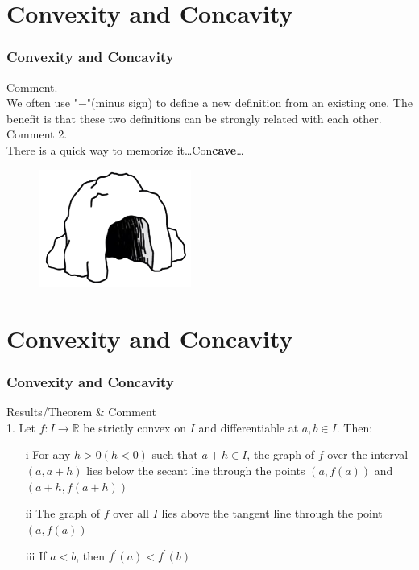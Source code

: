 \documentclass[12pt, t]{beamer}
\begin{document}
\section{Convexity and Concavity}
\begin{frame}
    \frametitle{Convexity and Concavity}
    Comment. \\
    \vspace{0.5em}
    \hspace{1em}
    We often use "$-$"(minus sign) to define a new definition from an existing one. The benefit is that these two definitions can
    be strongly related with each other.\\
    \vspace{1em}
    Comment 2.\\
    \hspace{1em}
    There is a quick way to memorize it\dots\hspace{2em}Con\textbf{cave}\dots
    \begin{figure}[H]
        \centering
        \includegraphics[width=5cm]{Figures/Concave.png}
    \end{figure}

\end{frame}

\section{Convexity and Concavity}
\begin{frame}
    \frametitle{Convexity and Concavity}
    Results/Theorem \& Comment\\
    \vspace{1em}
    1. Let $f:I\rightarrow\mathbb{R}$ be strictly convex on $I$ and differentiable at $a,b\in I$. Then:
    \begin{enumerate}
        \item[i] For any $h>0(h<0)$ such that $a+h\in I$, the graph of $f$ over the interval $(a,a+h)$ lies below the secant line through the
            points $(a,f(a))$ and $(a+h, f(a+h))$
        \item[ii] The graph of $f$ over all $I$ lies above the tangent line through the point $(a, f(a))$
        \item[iii] If $a<b$, then $f^\prime (a)<f^\prime (b)$
    \end{enumerate}


\end{frame}
\end{document}
